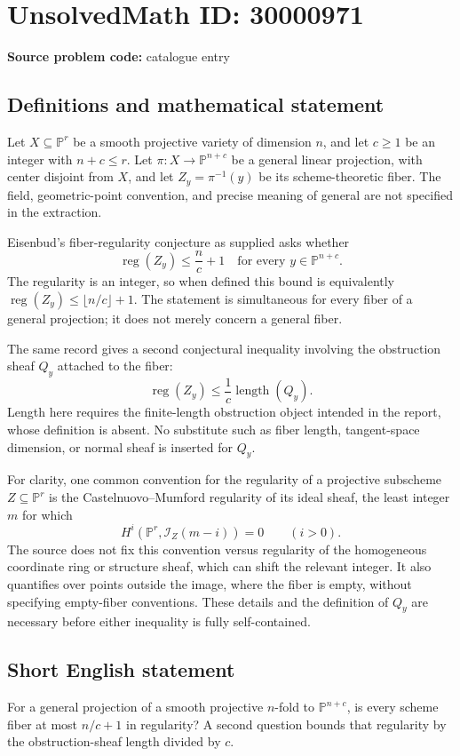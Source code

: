 \documentclass[11pt]{article}
\newcommand{\PP}{\mathbb{P}}
\begin{document}
\section*{UnsolvedMath ID: 30000971}
\textbf{Source problem code:} catalogue entry
\subsection{Definitions and mathematical statement}
Let \(X\subseteq\PP^r\) be a smooth projective variety of dimension \(n\), and let \(c\geq1\) be an integer with \(n+c\leq r\). Let \(\pi:X\to\PP^{n+c}\) be a general linear projection, with center disjoint from \(X\), and let \(Z_y=\pi^{-1}(y)\) be its scheme-theoretic fiber. The field, geometric-point convention, and precise meaning of general are not specified in the extraction.

Eisenbud's fiber-regularity conjecture as supplied asks whether
\[
\operatorname{reg}(Z_y)\leq\frac nc+1
\quad\text{for every }y\in\PP^{n+c}.
\]
The regularity is an integer, so when defined this bound is equivalently \(\operatorname{reg}(Z_y)\leq\lfloor n/c\rfloor+1\). The statement is simultaneous for every fiber of a general projection; it does not merely concern a general fiber.

The same record gives a second conjectural inequality involving the obstruction sheaf \(Q_y\) attached to the fiber:
\[
\operatorname{reg}(Z_y)\leq\frac1c\operatorname{length}(Q_y).
\]
Length here requires the finite-length obstruction object intended in the report, whose definition is absent. No substitute such as fiber length, tangent-space dimension, or normal sheaf is inserted for \(Q_y\).

For clarity, one common convention for the regularity of a projective subscheme \(Z\subseteq\PP^r\) is the Castelnuovo--Mumford regularity of its ideal sheaf, the least integer \(m\) for which
\[
H^i(\PP^r,\mathcal I_Z(m-i))=0\qquad(i>0).
\]
The source does not fix this convention versus regularity of the homogeneous coordinate ring or structure sheaf, which can shift the relevant integer. It also quantifies over points outside the image, where the fiber is empty, without specifying empty-fiber conventions. These details and the definition of \(Q_y\) are necessary before either inequality is fully self-contained.
\subsection{Short English statement}
For a general projection of a smooth projective \(n\)-fold to \(\PP^{n+c}\), is every scheme fiber at most \(n/c+1\) in regularity? A second question bounds that regularity by the obstruction-sheaf length divided by \(c\).
\end{document}
